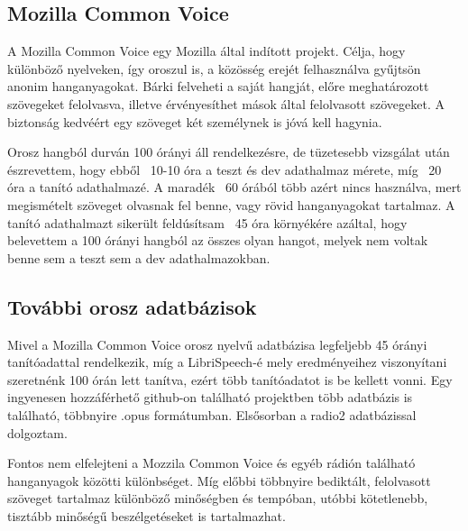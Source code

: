 \subsection{Mozilla Common Voice}

A Mozilla Common Voice egy Mozilla által indított projekt. Célja, hogy különböző nyelveken, így oroszul is, a közösség erejét felhasználva gyűjtsön anonim hanganyagokat. Bárki felveheti a saját hangját, előre meghatározott szövegeket felolvasva, illetve érvényesíthet mások által felolvasott szövegeket. A biztonság kedvéért egy szöveget két személynek is jóvá kell hagynia.


Orosz hangból durván 100 órányi áll rendelkezésre, de tüzetesebb vizsgálat után észrevettem, hogy ebből ~10-10 óra a teszt és dev adathalmaz mérete, míg ~20 óra a tanító adathalmazé. A maradék ~60 órából több azért nincs használva, mert megismételt szöveget olvasnak fel benne, vagy rövid hanganyagokat tartalmaz. A tanító adathalmazt sikerült feldúsítsam ~45 óra környékére azáltal, hogy belevettem a 100 órányi hangból az összes olyan hangot, melyek nem voltak benne sem a teszt sem a dev adathalmazokban.


\subsection{További orosz adatbázisok}

Mivel a Mozilla Common Voice orosz nyelvű adatbázisa legfeljebb 45 órányi tanítóadattal rendelkezik, míg a LibriSpeech-é mely eredményeihez viszonyítani szeretnénk 100 órán lett tanítva, ezért több tanítóadatot is be kellett vonni. Egy ingyenesen hozzáférhető github-on található projektben több adatbázis is található, többnyire .opus formátumban. Elsősorban a radio2 adatbázissal dolgoztam.

Fontos nem elfelejteni a Mozzila Common Voice és egyéb rádión található hanganyagok közötti különbséget. Míg előbbi többnyire bediktált, felolvasott szöveget tartalmaz különböző minőségben és tempóban, utóbbi kötetlenebb, tisztább minőségű beszélgetéseket is tartalmazhat.



